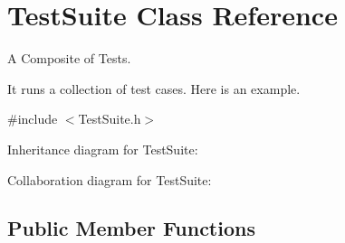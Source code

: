 \hypertarget{class_test_suite}{\section{Test\+Suite Class Reference}
\label{class_test_suite}
}


A Composite of Tests.

It runs a collection of test cases. Here is an example.  




{\ttfamily \#include $<$Test\+Suite.\+h$>$}



Inheritance diagram for Test\+Suite\+:


Collaboration diagram for Test\+Suite\+:
\subsection*{Public Member Functions}

